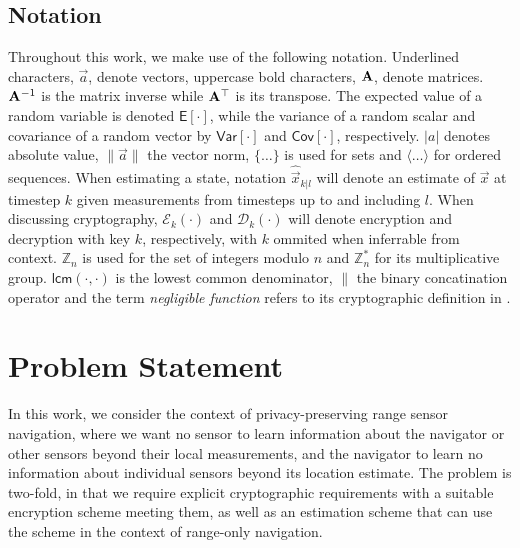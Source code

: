 \documentclass[10pt,letterpaper,oneside,twocolumn,journal]{IEEEtran}
\theoremstyle{definition}
\theoremstyle{definition}
\theoremstyle{remark}
\begin{document}
\subsection{Notation}
Throughout this work, we make use of the following notation. Underlined characters, $\vec{a}$, denote vectors, uppercase bold characters, ${{\mathbf{A}}}$, denote matrices. ${{\mathbf{A}}}^{-1}$ is the matrix inverse while ${{\mathbf{A}}}^\top$ is its transpose. The expected value of a random variable is denoted $\mathsf{E}[\cdot]$, while the variance of a random scalar and covariance of a random vector by $\mathsf{Var}[\cdot]$ and $\mathsf{Cov}[\cdot]$, respectively. $|a|$ denotes absolute value, $\lVert\vec{a}\rVert$ the vector norm, $\{\dots\}$ is used for sets and $\langle\dots\rangle$ for ordered sequences. When estimating a state, notation $\hat{\vec{x}}_{k|l}$ will denote an estimate of $\vec{x}$ at timestep $k$ given measurements from timesteps up to and including $l$. When discussing cryptography, $\mathcal{E}_{k}(\cdot)$ and $\mathcal{D}_{k}(\cdot)$ will denote encryption and decryption with key $k$, respectively, with $k$ ommited when inferrable from context. $\mathbb{Z}_n$ is used for the set of integers modulo $n$ and $\mathbb{Z}^*_n$ for its multiplicative group. $\mathsf{lcm}(\cdot,\cdot)$ is the lowest common denominator, $\|$ the binary concatination operator and the term \textit{negligible function} refers to its cryptographic definition in \cite{katzIntroductionModernCryptography2008}.

% 
%                                                                                
%                                                                                
%                                                                                
% 

\section{Problem Statement} \label{sec:problem_statement}
In this work, we consider the context of privacy-preserving range sensor navigation, where we want no sensor to learn information about the navigator or other sensors beyond their local measurements, and the navigator to learn no information about individual sensors beyond its location estimate. The problem is two-fold, in that we require explicit cryptographic requirements with a suitable encryption scheme meeting them, as well as an estimation scheme that can use the scheme in the context of range-only navigation.
\end{document}

